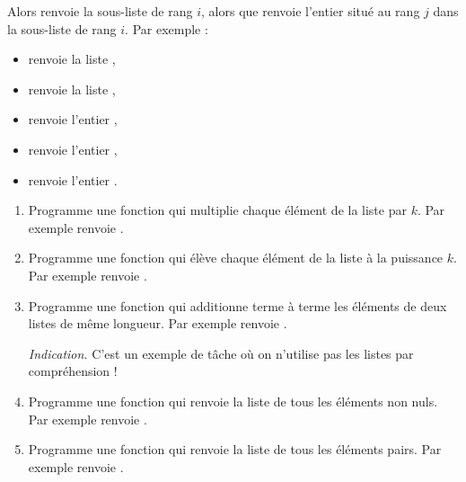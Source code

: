 \documentclass[11pt,class=report,crop=false]{standalone}
\begin{document}
\begin{cours}
\begin{itemize}
  Alors  renvoie la sous-liste de rang $i$, alors que
   renvoie l'entier situé au rang $j$ dans la sous-liste de rang $i$. Par exemple :
  \begin{itemize}
  \item {} renvoie la liste \ci{[2,14,5]},
  \item {} renvoie la liste \ci{[3,5,7]},
  \item {} renvoie l'entier ,
  \item {} renvoie l'entier ,
  \item {} renvoie l'entier .
\end{itemize}

\end{itemize}
\end{cours}



\begin{activite}


\begin{enumerate}
  \item Programme une fonction  qui multiplie chaque élément de la liste par $k$. Par exemple  renvoie \ci{[2,4,6,8,10]}.
  
  \item Programme une fonction  qui élève chaque élément de la liste à la puissance $k$. Par exemple  renvoie \ci{[1,8,27,64,125]}.
  
  \item Programme une fonction  qui additionne terme à terme les éléments de deux listes de même longueur. Par exemple  renvoie \ci{[5,7,9]}.
  
  \emph{Indication.} C'est un exemple de tâche où on n'utilise pas les listes par compréhension !
  

  \item Programme une fonction  qui renvoie la liste de tous les éléments non nuls. Par exemple  renvoie \ci{[1,2,3,4,5]}.
  
  \item Programme une fonction  qui renvoie la liste de tous les éléments pairs. Par exemple  renvoie \ci{[0,2,0,4,0]}.
  
\end{enumerate}

\end{activite}
\end{document}
